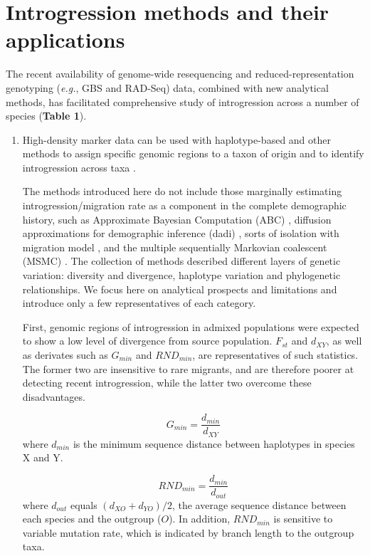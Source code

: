 \documentclass[11pt]{article}
\begin{document}
\section*{Introgression methods and their applications}

The recent availability of genome-wide resequencing and reduced-representation genotyping (\emph{e.g.}, GBS and RAD-Seq) data, combined with new analytical methods, has facilitated comprehensive study of introgression across a number of species (\textbf{Table 1}).

\begin{enumerate}

\item{High-density marker data can be used with haplotype-based and other methods to assign specific genomic regions to a taxon of origin and to identify introgression across taxa \cite{Martin2015,Price2009,Lawson2012,pease2015,rosenzweig2016,geneva2015}.}

The methods introduced here do not include those marginally estimating introgression\slash migration rate as a component in the complete demographic history, such as Approximate Bayesian Computation (ABC) \cite{beaumont2002}, diffusion approximations for demographic inference (dadi) \cite {gutenkunst2009}, sorts of isolation with migration model \cite{hey2004}, and the multiple sequentially Markovian coalescent (MSMC) \cite{schiffels2014}. 
The collection of methods described different layers of genetic variation: diversity and divergence, haplotype variation and phylogenetic relationships.
We focus here on analytical prospects and limitations and introduce only a few representatives of each category.

First, genomic regions of introgression in admixed populations were expected to show a low level of divergence from source population.
$F_{st}$ and $d_{XY}$, as well as derivates such as $G_{min}$ \cite{geneva2015} and $RND_{min}$\cite{rosenzweig2016}, are representatives of such statistics. 
The former two are insensitive to rare migrants, and are therefore poorer at detecting recent introgression, while the latter two overcome these disadvantages.
 
 \begin{equation}
    G_{min} = \frac{d_{min}}{d_{XY}}
 \end{equation}
 where $d_{min}$ is the minimum sequence distance between haplotypes in species X and Y.
 
 \begin{equation}
 	RND_{min} = \frac{d_{min}}{d_{out}}
 \end{equation}
where $d_{out}$ equals $(d_{XO} + d_{YO})/2$, the average sequence distance between each species and the outgroup ($O$).
In addition, $RND_{min}$ is sensitive to variable mutation rate, which is indicated by branch length to the outgroup taxa. 
 

\end{enumerate}
\end{document}
